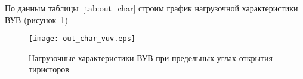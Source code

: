По данным таблицы~\ref{tab:out_char} строим график нагрузочной характеристики ВУВ (рисунок~\ref{fig:out_char_vuv})
\begin{figure}[H]
    \centering    
    \texttt{[image: out\_char\_vuv.eps]}
    \caption{Нагрузочные характеристики ВУВ при предельных углах открытия тиристоров}
    \label{fig:out_char_vuv}
\end{figure}










